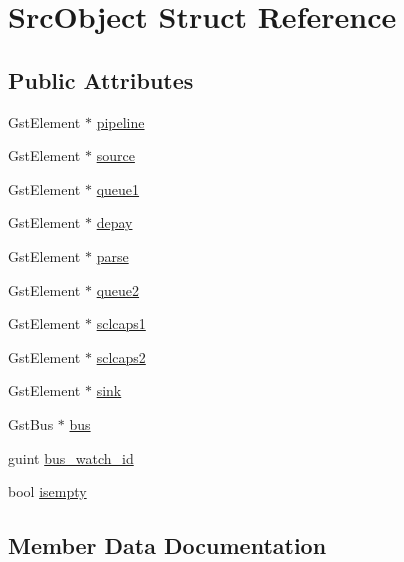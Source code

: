 \hypertarget{structSrcObject}{}\section{Src\+Object Struct Reference}
\label{structSrcObject}
\subsection*{Public Attributes}
\begin{DoxyCompactItemize}
\item 
Gst\+Element $\ast$ \mbox{\hyperlink{structSrcObject_a5b4114faa6f93001c18973a0221bcde2}{pipeline}}
\item 
Gst\+Element $\ast$ \mbox{\hyperlink{structSrcObject_a255996ef7f6136eec675a4801de19594}{source}}
\item 
Gst\+Element $\ast$ \mbox{\hyperlink{structSrcObject_adefcd507085c87e9945cdfc9c3874b55}{queue1}}
\item 
Gst\+Element $\ast$ \mbox{\hyperlink{structSrcObject_a44bbe3df1db2c2dc4921681c2e1785c3}{depay}}
\item 
Gst\+Element $\ast$ \mbox{\hyperlink{structSrcObject_a16067ad399993284540b162de906d37b}{parse}}
\item 
Gst\+Element $\ast$ \mbox{\hyperlink{structSrcObject_a438b043235310ad8b95259292cc13653}{queue2}}
\item 
Gst\+Element $\ast$ \mbox{\hyperlink{structSrcObject_a8064905a4e6cf7811fdd2af866faf57e}{sclcaps1}}
\item 
Gst\+Element $\ast$ \mbox{\hyperlink{structSrcObject_a34f88f7863d2883e71da084d81352487}{sclcaps2}}
\item 
Gst\+Element $\ast$ \mbox{\hyperlink{structSrcObject_a27995708fc9784242d71e0536265b705}{sink}}
\item 
Gst\+Bus $\ast$ \mbox{\hyperlink{structSrcObject_a29c760c64dd84f1dce47122d0af9a19a}{bus}}
\item 
guint \mbox{\hyperlink{structSrcObject_aede4538f915bcbdb555a8beb1cd51e59}{bus\+\_\+watch\+\_\+id}}
\item 
bool \mbox{\hyperlink{structSrcObject_a0026403598659f8bbdf704851d2de9dc}{isempty}}
\end{DoxyCompactItemize}


\subsection{Member Data Documentation}
\mbox{\label{structSrcObject_a29c760c64dd84f1dce47122d0af9a19a}} 
